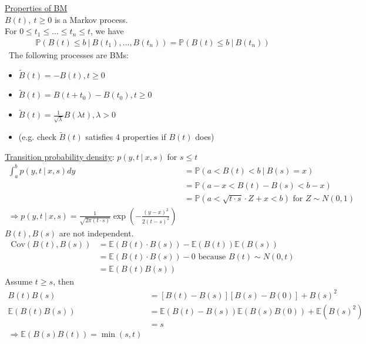 \documentclass[12pt, letterpaper]{article}
\begin{document}
\underline{Properties of BM} \\
$B(t),\ t \ge 0$ is a Markov process. \\
For $0 \le t_1 \le ... \le t_n \le t$, we have
\begin{align*}
    \mathbb{P}(B(t) \le b\ |\  B(t_1), \dots, B(t_n)) = \mathbb{P}(B(t) \le b\ |\ B(t_n))
\end{align*}
\ The following processes are BMs:
\begin{itemize}
    \item $\tilde B(t) = -B(t), t \ge 0$ 
    \item $\tilde B(t) = B(t + t_0) - B(t_0), t \ge 0$ 
    \item $\tilde B(t) = \frac{1}{\sqrt \lambda}B(\lambda t), \lambda > 0$  
    \item (e.g. check $\tilde B(t)$ satisfies 4 properties if $B(t)$ does)
\end{itemize}
\underline{Transition probability density}: $p(y,t\ |\ x,s)$ for $s \le t$
\begin{align*}
    \int_{a}^{b} p(y,t\ |\ x,s)dy &= \mathbb{P}(a < B(t) < b\ |\ B(s) = x) \\
    &= \mathbb{P}(a-x < B(t) - B(s) < b-x) \\
    &= \mathbb{P}(a < \sqrt{t\cdot s} \cdot Z + x < b) \text{ for } Z\sim N(0,1) \\
    \Rightarrow p(y,t\ |\ x,s) = \frac{1}{\sqrt{2\pi(t\cdot s)}} \exp(-\frac{(y-x)^2}{2(t-s)^2})
\end{align*}
$B(t), B(s)$ are not independent. 
\begin{align*}
    \text{Cov}(B(t), B(s)) &= \mathbb{E}(B(t)\cdot B(s)) - \mathbb{E}(B(t))\mathbb{E}(B(s)) \\
    &= \mathbb{E}(B(t)\cdot B(s)) - 0 \text{ because } B(t) \sim N(0,t) \\
    &= \mathbb{E}(B(t)B(s))
\end{align*}
Assume $t \ge s$, then 
\begin{align*}
    B(t)B(s) &= [B(t)-B(s)][B(s)-B(0)]+ B(s)^2 \\
    \mathbb{E}(B(t)B(s)) &= \mathbb{E}(B(t) - B(s)) \mathbb{E}(B(s)B(0)) + \mathbb{E}(B(s)^2) \\
    &= s  \\
    \Rightarrow \mathbb{E}(B(s)B(t)) = \min(s,t)
\end{align*}
\end{document}
